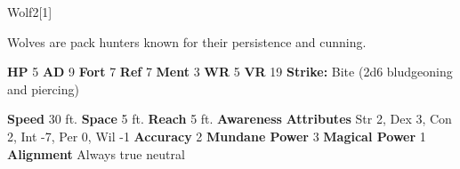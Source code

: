   
  \begin{monsection}{Wolf}{2}[1]
    \vspace{-1em}\vspace{-1em}
    \vspace{0em}

    
      Wolves are pack hunters known for their persistence and cunning.
    
    

    \begin{spellcontent}
      \begin{spelltargetinginfo}
        \pari \textbf{HP} 5 \monsep
          \textbf{AD} 9 \monsep
          \textbf{Fort} 7 \monsep
          \textbf{Ref} 7 \monsep
          \textbf{Ment} 3
        \pari \textbf{WR} 5 \monsep
        \textbf{VR} 19
        \pari \textbf{Strike:}
            Bite  (2d6 bludgeoning and piercing)
      \end{spelltargetinginfo}
    \end{spellcontent}
    \begin{monsterfooter}
      \pari \textbf{Speed} 30 ft. \monsep
        \textbf{Space} 5 ft. \monsep
        \textbf{Reach} 5 ft.
      \pari \textbf{Awareness} 
      \pari \textbf{Attributes}
        Str 2, Dex 3,
        Con 2, Int -7,
        Per 0, Wil -1
      \pari \textbf{Accuracy} 2 \monsep
        \textbf{Mundane Power} 3 \monsep
      \textbf{Magical Power} 1
      \pari \textbf{Alignment} Always true neutral
    \end{monsterfooter}
  \end{monsection}
  
